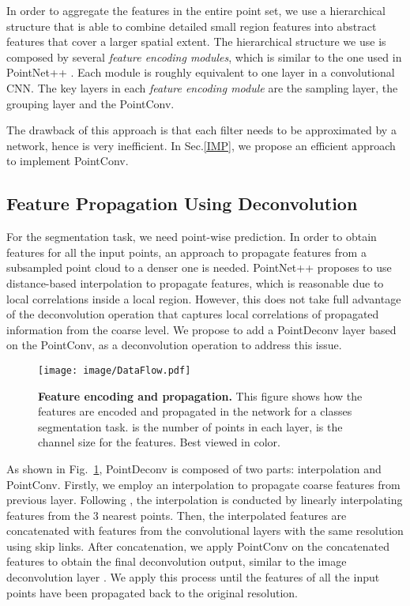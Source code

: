 \documentclass[10pt,twocolumn,letterpaper]{article}
\begin{document}
In order to aggregate the features in the entire point set, we use a hierarchical structure that is able to combine detailed small region features into abstract features that cover a larger spatial extent. The hierarchical structure we use is composed by several \textit{feature encoding modules}, which is similar to the one used in PointNet++ \cite{qi2017pointnet++}. Each module is roughly equivalent to one layer in a convolutional CNN. The key layers in each \textit{feature encoding module} are the sampling layer, the grouping layer and the PointConv.

The drawback of this approach is that each filter needs to be approximated by a network, hence is very inefficient. In Sec.\ref{IMP}, we propose an efficient approach to implement PointConv.

\subsection{Feature Propagation Using Deconvolution} \label{FPD}

For the segmentation task, we need point-wise prediction. In order to obtain features for all the input points, an approach to propagate features from a subsampled point cloud to a denser one is needed. PointNet++ \cite{qi2017pointnet++} proposes to use distance-based interpolation to propagate features, which is reasonable due to local correlations inside a local region. However, this does not take full advantage of the deconvolution operation that captures local correlations of propagated information from the coarse level. We propose to add a PointDeconv layer based on the PointConv, as a deconvolution operation to address this issue. 
\begin{figure}
	\centering
	\texttt{[image: image/DataFlow.pdf]}
	\caption{\textbf{Feature encoding and propagation.} This figure shows how the features are encoded and propagated in the network for a  classes segmentation task.  is the number of points in each layer,  is the channel size for the features. Best viewed in color.}
	\label{fig5}
	\vskip -0.1in
\end{figure}

As shown in Fig.~\ref{fig5}, PointDeconv is composed of two parts: interpolation and PointConv. Firstly, we employ an interpolation to propagate coarse features from previous layer. Following \cite{qi2017pointnet++}, the interpolation is conducted by linearly interpolating features from the 3 nearest points. Then, the interpolated features are concatenated with features from the convolutional layers with the same resolution using skip links. After concatenation, we apply PointConv on the concatenated features to obtain the final deconvolution output,  similar to the image deconvolution layer \cite{noh2015learning}. We apply this process until the features of all the input points have been propagated back to the original resolution.
\end{document}
